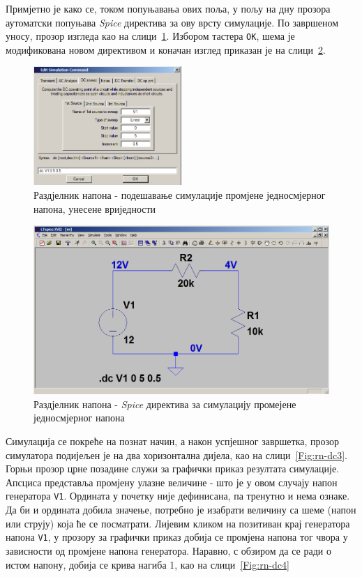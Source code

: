 Примјетно је како се, током попуњавања ових поља, у пољу на дну прозора аутоматски попуњава \textit{Spice} директива за ову врсту симулације. По завршеном уносу, прозор изгледа као на слици~\ref{Fig:rn-dc1}. Избором тастера \texttt{OK}, шема је модификована новом директивом и коначан изглед приказан је на слици~\ref{Fig:rn-dc2}.

\begin{figure}[h]
\centering
\includegraphics[width=0.5\textwidth]{figs/rn-dc1.PNG}
\caption{Раздјелник напона - подешавање симулације промјене једносмјерног напона, унесене вриједности}
\label{Fig:rn-dc1}
\end{figure}

\begin{figure}[h]
\centering
\includegraphics[width=\figwidth\textwidth]{figs/rn-dc2.PNG}
\caption{Раздјелник напона - \textit{Spice} директива за симулацију промејене једносмјерног напона}
\label{Fig:rn-dc2}
\end{figure}

Симулација се покреће на познат начин, а након успјешног завршетка, прозор симулатора подијељен је на два хоризонтална дијела, као на слици~\ref{Fig:rn-dc3}. Горњи прозор црне позадине служи за графички приказ резултата симулације. Апсциса представља промјену улазне величине - што је у овом случају напон генератора \texttt{V1}. Ордината у почетку није дефинисана, па тренутно и нема ознаке. Да би и ордината добила значење, потребно је изабрати величину са шеме (напон или струју) која ће се посматрати. Лијевим кликом на позитиван крај генератора напона \texttt{V1}, у прозору за графички приказ добија се промјена напона тог чвора у зависности од промјене напона генератора. Наравно, с обзиром да се ради о истом напону, добија се крива нагиба 1, као на слици~\ref{Fig:rn-dc4}

